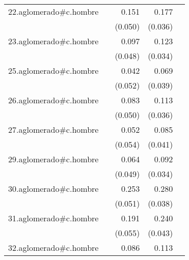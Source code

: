 {\begin{longtable}{l*{4}{D{.}{.}{-1}}}
\addlinespace
22.aglomerado#c.hombre&                     &       0.151\sym{**} &       0.177\sym{***}&                     \\
            &                     &     (0.050)         &     (0.036)         &                     \\
\addlinespace
23.aglomerado#c.hombre&                     &       0.097\sym{*}  &       0.123\sym{***}&                     \\
            &                     &     (0.048)         &     (0.034)         &                     \\
\addlinespace
25.aglomerado#c.hombre&                     &       0.042         &       0.069         &                     \\
            &                     &     (0.052)         &     (0.039)         &                     \\
\addlinespace
26.aglomerado#c.hombre&                     &       0.083         &       0.113\sym{**} &                     \\
            &                     &     (0.050)         &     (0.036)         &                     \\
\addlinespace
27.aglomerado#c.hombre&                     &       0.052         &       0.085\sym{*}  &                     \\
            &                     &     (0.054)         &     (0.041)         &                     \\
\addlinespace
29.aglomerado#c.hombre&                     &       0.064         &       0.092\sym{**} &                     \\
            &                     &     (0.049)         &     (0.034)         &                     \\
\addlinespace
30.aglomerado#c.hombre&                     &       0.253\sym{***}&       0.280\sym{***}&                     \\
            &                     &     (0.051)         &     (0.038)         &                     \\
\addlinespace
31.aglomerado#c.hombre&                     &       0.191\sym{***}&       0.240\sym{***}&                     \\
            &                     &     (0.055)         &     (0.043)         &                     \\
\addlinespace
32.aglomerado#c.hombre&                     &       0.086         &       0.113\sym{***}&                     \\

\end{longtable}}
